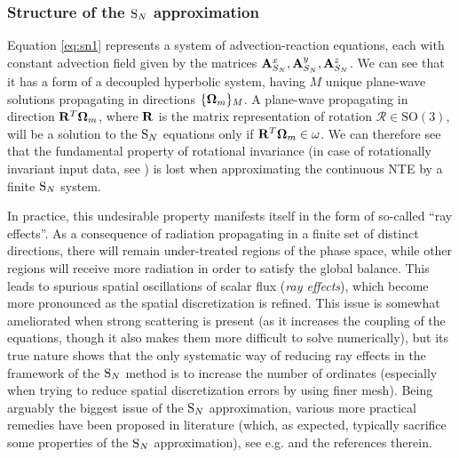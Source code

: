 \subsubsection{Structure of the $\text{S}_{N}$ approximation}
Equation \eqref{eq:sn1} represents a system of advection-reaction equations, each with constant advection field given by
the matrices $\mathbf{A}_{S_N}^x, \mathbf{A}_{S_N}^y, \mathbf{A}_{S_N}^z$. We can see that it has a form of a decoupled
hyperbolic system, having $M$ unique plane-wave solutions propagating in directions $\{\mathbf{\Omega}_m\}_{M}$. A
plane-wave propagating in direction $\mathbf{R}^T\mathbf{\Omega}_m$, where $\mathbf{R}$ is the matrix representation of rotation
$\mathcal{R}\in \mathrm{SO}(3)$, will be a solution to the $\text{S}_{N}$ equations only if $\mathbf{R}^T\mathbf{\Omega}_m \in \omega$. We
can therefore see that the fundamental property of rotational invariance (in case of rotationally invariant input data,
see ) is lost when approximating the continuous NTE by a finite $\text{S}_{N}$ system.

In practice, this undesirable property manifests itself in the form of so-called ``ray effects''. As a consequence of
radiation propagating in a finite set of distinct directions, there will remain under-treated regions of the phase
space, while other regions will receive more radiation in order to satisfy the global balance. This leads to spurious spatial oscillations
of scalar flux (\textit{ray effects}), which become more pronounced as the spatial discretization is refined.
This issue is somewhat ameliorated when strong scattering is present (as it increases the coupling of the equations,
though it also makes them more difficult to solve numerically), but its true nature shows that the only systematic way
of reducing ray effects in the framework of the $\text{S}_{N}$ method is to increase the number of ordinates (especially when
trying to reduce spatial discretization errors by using finer mesh). Being arguably the biggest issue of the $\text{S}_{N}$ approximation, various more practical
remedies have been proposed in literature (which, as expected, typically sacrifice some properties of the $\text{S}_{N}$
approximation), see e.g. \cite{Li1} and the references therein.

